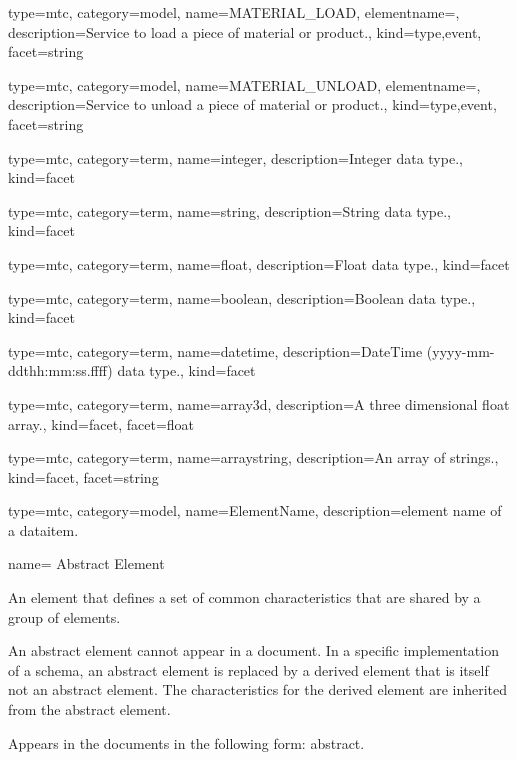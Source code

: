 {
  type=mtc,
  category=model,
  name={MATERIAL\_LOAD},
  elementname=,
  description={Service to load a piece of material or product.},
  kind={type,event},
  facet={\gls{string}}
}


{
  type=mtc,
  category=model,
  name={MATERIAL\_UNLOAD},
  elementname=,
  description={Service to unload a piece of material or product.},
  kind={type,event},
  facet={\gls{string}}
}


{
  type=mtc,
  category=term,
  name={integer},
  description={Integer data type.},
  kind={facet}
}


{
  type=mtc,
  category=term,
  name={string},
  description={String data type.},
  kind={facet}
}


{
  type=mtc,
  category=term,
  name={float},
  description={Float data type.},
  kind={facet}
}


{
  type=mtc,
  category=term,
  name={boolean},
  description={Boolean data type.},
  kind={facet}
}


{
  type=mtc,
  category=term,
  name={datetime},
  description={DateTime (yyyy-mm-ddthh:mm:ss.ffff) data type.},
  kind={facet}
}


{
  type=mtc,
  category=term,
  name={array3d},
  description={A three dimensional \gls{float} array.},
  kind={facet},
  facet={\gls{float}}
}

{
  type=mtc,
  category=term,
  name={arraystring},
  description={An array of \glspl{string}.},
  kind={facet},
  facet={\gls{string}}
}

{
  type=mtc,
  category=model,
  name={ElementName},
  description={\gls{element name} of a \gls{dataitem}.}
}

{
  name= {Abstract Element}
}
{
  An element that defines a set of common characteristics that are shared by a group of elements.
  
  An abstract element cannot appear in a document. In a specific implementation of a schema, an abstract element is replaced by a derived element that is itself not an abstract element. The characteristics for the derived element are inherited from the abstract element. 
  
  Appears in the documents in the following form: abstract.
}


